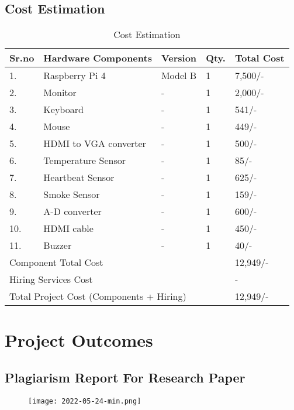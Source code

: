 \documentclass[12pt,a4paper]{report}
\begin{document}
\section{ Cost Estimation }
\begin{table}[ht]
    \centering
    \resizebox{\textwidth}{!}
    {
\begin{tabular}{|p{0.5in}|p{1.6in}|p{1.0in}|p{0.5in}|p{0.9in}|} \hline 
\textbf{Sr.no} & \textbf{Hardware Components} & \textbf{Version } & \textbf{Qty.} & \textbf{Total Cost } \\ \hline 
1. & Raspberry Pi 4 & Model B & 1 & 7,500/- \\ \hline 
2. & Monitor & - & 1 & 2,000/- \\ \hline 
3. & Keyboard & - & 1 & 541/- \\ \hline 
4. & Mouse & - & 1 & 449/- \\ \hline 
5. & HDMI to VGA converter & - & 1 & 500/- \\ \hline 
6. & Temperature Sensor & - & 1 & 85/- \\ \hline 
7. & Heartbeat Sensor  & - & 1 & 625/- \\ \hline 
8. & Smoke Sensor & - & 1 & 159/- \\ \hline 
9. & A-D converter & - & 1 & 600/- \\ \hline 
10. & HDMI cable  & - & 1 & 450/- \\ \hline 
11. & Buzzer & - & 1 & 40/- \\ \hline 
\multicolumn{4}{|p{1in}|}{Component Total Cost} & 12,949/- \\ \hline 
\multicolumn{4}{|p{1in}|}{Hiring Services Cost} & - \\ \hline 
\multicolumn{4}{|p{1in}|}{Total Project Cost (Components + Hiring)} & 12,949/- \\ \hline 
\end{tabular}
}
    \caption{Cost Estimation}
    \label{tab:my_label}
\end{table}


\appendix

\chapter{Project Outcomes}%
\newpage
\section{Plagiarism Report For Research Paper}
\begin{figure}[htp]
    \texttt{[image: 2022-05-24-min.png]}
\end{figure}
\end{document}

